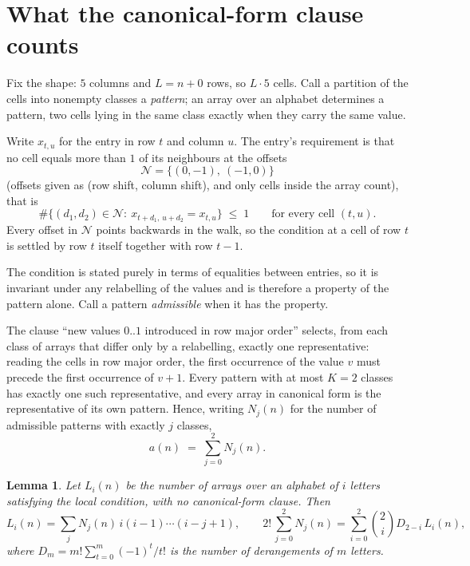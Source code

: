 \documentclass[11pt,a4paper]{article}
\theoremstyle{plain}
\newtheorem{lemma}[theorem]{Lemma}
\theoremstyle{definition}
\begin{document}
\section{What the canonical-form clause counts}

Fix the shape: $5$ columns and $L=n+0$ rows, so $L\cdot5$ cells. Call a
partition of the cells into nonempty classes a \emph{pattern}; an array over an alphabet
determines a pattern, two cells lying in the same class exactly when they carry the same
value.

Write $x_{t,u}$ for the entry in row $t$ and column $u$. The
entry's requirement is that no cell equals more than $1$ of its neighbours at the
offsets
\[
\mathcal N=\{(0,-1),\ (-1,0)\}
\]
(offsets given as (row shift, column shift), and only cells inside the array count),
that is
\begin{equation}\label{eq:loc}
\#\bigl\{(d_1,d_2)\in\mathcal N:\ x_{t+d_1,\,u+d_2}=x_{t,u}\bigr\}\;\le\;1
\qquad\text{for every cell }(t,u).
\end{equation}
Every offset in $\mathcal N$ points backwards in the walk, so the condition at a cell of
row $t$ is settled by row $t$ itself together with row $t-1$.

The condition is stated purely in terms of equalities between entries, so it is invariant
under any relabelling of the values and is therefore a property of the pattern alone. Call a
pattern \emph{admissible} when it has the property.

The clause ``new values $0..1$ introduced in row major order'' selects, from each class
of arrays that differ only by a relabelling, exactly one representative: reading the cells in
row major order, the first occurrence of the value $v$ must precede the first occurrence of
$v+1$. Every pattern with at most $K=2$ classes has exactly one such representative, and
every array in canonical form is the representative of its own pattern. Hence, writing
$N_j(n)$ for the number of admissible patterns with exactly $j$ classes,
\begin{equation}\label{eq:apat}
a(n)\;=\;\sum_{j=0}^{2}N_j(n).
\end{equation}

\begin{lemma}\label{lem:inv}
Let $L_i(n)$ be the number of arrays over an alphabet of $i$ letters satisfying the local
condition, with no canonical-form clause. Then
\[
L_i(n)=\sum_j N_j(n)\,i(i-1)\cdots(i-j+1),
\qquad
2!\,\sum_{j=0}^{2}N_j(n)=\sum_{i=0}^{2}\binom{2}{i}D_{2-i}\,L_i(n),
\]
where $D_m=m!\sum_{t=0}^{m}(-1)^t/t!$ is the number of derangements of $m$ letters.
\end{lemma}
\end{document}
